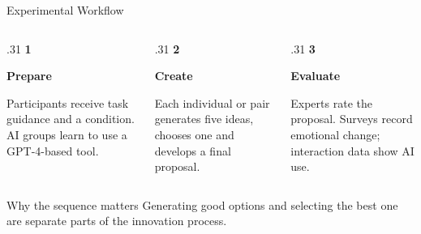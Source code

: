 \begin{frame}[t]{Experimental Workflow}
\small
\vspace{0.30cm}
\begin{columns}[T,onlytextwidth]
\begin{column}{.31\textwidth}
{\Large\textcolor{paperred}{\bfseries 1}}\par\medskip
{\bfseries Prepare}\par\smallskip
Participants receive task guidance and a condition. AI groups learn to use a GPT-4-based tool.
\end{column}
\begin{column}{.31\textwidth}
{\Large\textcolor{paperred}{\bfseries 2}}\par\medskip
{\bfseries Create}\par\smallskip
Each individual or pair generates five ideas, chooses one and develops a final proposal.
\end{column}
\begin{column}{.31\textwidth}
{\Large\textcolor{paperred}{\bfseries 3}}\par\medskip
{\bfseries Evaluate}\par\smallskip
Experts rate the proposal. Surveys record emotional change; interaction data show AI use.
\end{column}
\end{columns}

\vspace{0.82cm}
\begin{block}{Why the sequence matters}
Generating good options and selecting the best one are separate parts of the innovation process.
\end{block}
\end{frame}

